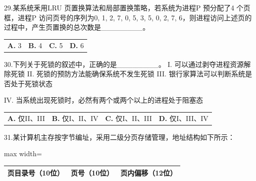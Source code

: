 \documentclass[UTF8,11pt]{ctexart}
\begin{document}
29.某系统釆用LRU 页置换算法和局部置换策略，若系统为进程P 预分配了4 个页框，进程P 访问页号的序列为0, 1, 2, 7, 0, 5, 3, 5, 0, 2, 7, 6，则进程访问上述页的过程中，产生页置换的总次数是\_\_\_\_\_\_\_\_。


\begin{center}\begin{tabular}{>{\raggedright\arraybackslash}p{\dimexpr(\linewidth-8\tabcolsep)/4\relax}>{\raggedright\arraybackslash}p{\dimexpr(\linewidth-8\tabcolsep)/4\relax}>{\raggedright\arraybackslash}p{\dimexpr(\linewidth-8\tabcolsep)/4\relax}>{\raggedright\arraybackslash}p{\dimexpr(\linewidth-8\tabcolsep)/4\relax}}
\textbf{A.} 3 & \textbf{B.} 4 & \textbf{C.} 5 & \textbf{D.} 6\\[.35em]\end{tabular}\end{center}

30.下列关于死锁的叙述中，正确的是\_\_\_\_\_\_\_\_。 I. 可以通过剥夺进程资源解除死锁 II. 死锁的预防方法能确保系统不发生死锁 III. 银行家算法可以判断系统是否处于死锁状态


IV. 当系统出现死锁时，必然有两个或两个以上的进程处于阻塞态


\begin{center}\begin{tabular}{>{\raggedright\arraybackslash}p{\dimexpr(\linewidth-8\tabcolsep)/4\relax}>{\raggedright\arraybackslash}p{\dimexpr(\linewidth-8\tabcolsep)/4\relax}>{\raggedright\arraybackslash}p{\dimexpr(\linewidth-8\tabcolsep)/4\relax}>{\raggedright\arraybackslash}p{\dimexpr(\linewidth-8\tabcolsep)/4\relax}}
\textbf{A.} 仅II、III & \textbf{B.} 仅I、II、IV & \textbf{C.} 仅I、II、III & \textbf{D.} 仅I、III、IV\\[.35em]\end{tabular}\end{center}

31.某计算机主存按字节编址，采用二级分页存储管理，地址结构如下所示：


\begin{center}\begin{adjustbox}{max width=\linewidth}\begin{tabular}{|>{\raggedright\arraybackslash}p{\dimexpr(\linewidth-6\tabcolsep-4\arrayrulewidth)/3\relax}|>{\raggedright\arraybackslash}p{\dimexpr(\linewidth-6\tabcolsep-4\arrayrulewidth)/3\relax}|>{\raggedright\arraybackslash}p{\dimexpr(\linewidth-6\tabcolsep-4\arrayrulewidth)/3\relax}|}\hline
页目录号（10位） & 页号（10位） & 页内偏移（12位）\\\hline\end{tabular}\end{adjustbox}\end{center}
\end{document}
